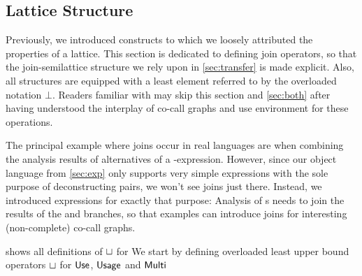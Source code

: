 \subsection{Lattice Structure}\label{sec:lattice}

Previously, we introduced constructs to which we loosely attributed the properties of a lattice. 
This section is dedicated to defining join operators, so that the join-semilattice structure we rely upon in \cref{sec:transfer} is made explicit.
Also, all structures are equipped with a least element referred to by the overloaded notation $\bot$.
Readers familiar with \textcite{card} may skip this section and \cref{sec:both} after having understood the interplay of co-call graphs and use environment for these operations.

The principal example where joins occur in real languages are when combining the analysis results of alternatives of a -expression. 
However, since our object language from \cref{sec:exp} only supports very simple  expressions with the sole purpose of deconstructing pairs, we won't see joins just there. 
Instead, we introduced  expressions for exactly that purpose: 
Analysis of s needs to join the results of the  and  branches, so that examples can introduce joins for interesting (\eg non-complete) co-call graphs.

 shows all definitions of $\sqcup$ for We start by defining overloaded least upper bound operators $\sqcup$ for $\text{\textsf{Use}}$, $\text{\textsf{Usage}}$ and $\text{\textsf{Multi}}$

